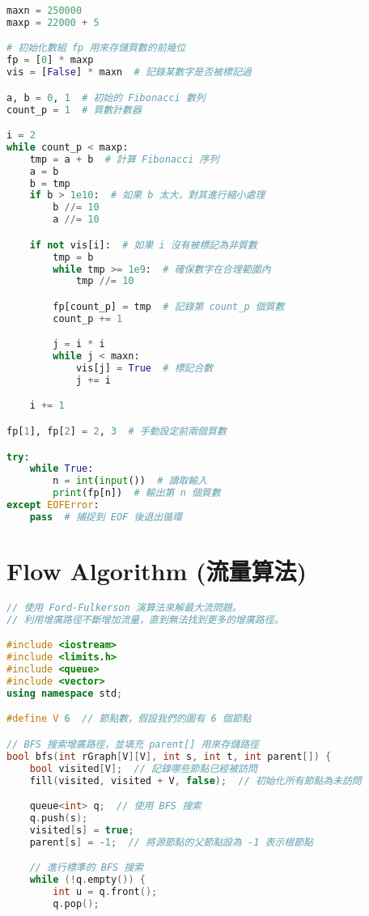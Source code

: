 \documentclass{article}
\begin{document}
\begin{multicols}{2}
\begin{lstlisting}[language=Python]
maxn = 250000
maxp = 22000 + 5

# 初始化數組 fp 用來存儲質數的前幾位
fp = [0] * maxp
vis = [False] * maxn  # 記錄某數字是否被標記過

a, b = 0, 1  # 初始的 Fibonacci 數列
count_p = 1  # 質數計數器

i = 2
while count_p < maxp:
    tmp = a + b  # 計算 Fibonacci 序列
    a = b
    b = tmp
    if b > 1e10:  # 如果 b 太大，對其進行縮小處理
        b //= 10
        a //= 10

    if not vis[i]:  # 如果 i 沒有被標記為非質數
        tmp = b
        while tmp >= 1e9:  # 確保數字在合理範圍內
            tmp //= 10

        fp[count_p] = tmp  # 記錄第 count_p 個質數
        count_p += 1

        j = i * i
        while j < maxn:
            vis[j] = True  # 標記合數
            j += i

    i += 1

fp[1], fp[2] = 2, 3  # 手動設定前兩個質數

try:
    while True:
        n = int(input())  # 讀取輸入
        print(fp[n])  # 輸出第 n 個質數
except EOFError:
    pass  # 捕捉到 EOF 後退出循環
\end{lstlisting}

\section{Flow Algorithm (流量算法)}

\begin{lstlisting}[language=C++]
// 使用 Ford-Fulkerson 演算法來解最大流問題。
// 利用增廣路徑不斷增加流量，直到無法找到更多的增廣路徑。

#include <iostream>
#include <limits.h>
#include <queue>
#include <vector>
using namespace std;

#define V 6  // 節點數，假設我們的圖有 6 個節點

// BFS 搜索增廣路徑，並填充 parent[] 用來存儲路徑
bool bfs(int rGraph[V][V], int s, int t, int parent[]) {
    bool visited[V];  // 記錄哪些節點已經被訪問
    fill(visited, visited + V, false);  // 初始化所有節點為未訪問

    queue<int> q;  // 使用 BFS 搜索
    q.push(s);
    visited[s] = true;
    parent[s] = -1;  // 將源節點的父節點設為 -1 表示根節點

    // 進行標準的 BFS 搜索
    while (!q.empty()) {
        int u = q.front();
        q.pop();


\end{lstlisting}
\end{multicols}
\end{document}
